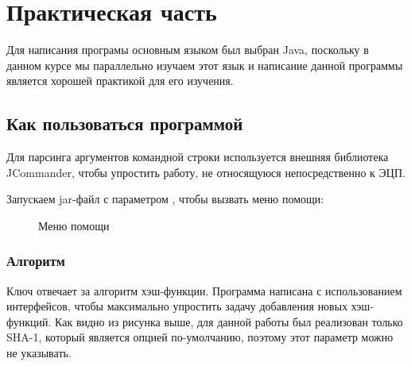 \section{Практическая часть}

Для написания програмы основным языком был выбран Java, поскольку в данном курсе мы параллельно изучаем этот язык и написание данной программы
является хорошей практикой для его изучения.

\subsection{Как пользоваться программой}

Для парсинга аргументов командной строки используется внешняя библиотека JCommander, чтобы упростить работу,
не относящуюся непосредственно к ЭЦП.

Запускаем jar-файл с параметром , чтобы вызвать меню помощи:
\begin{figure}[h!]
  \caption{Меню помощи}
\end{figure}

\subsubsection{Алгоритм}
Ключ  отвечает за алгоритм хэш-функции. Программа написана с использованием интерфейсов, чтобы максимально упростить задачу добавления новых хэш-функций.
Как видно из рисунка выше, для данной работы был реализован только SHA-1, который является опцией по-умолчанию, поэтому этот параметр можно не указывать.

